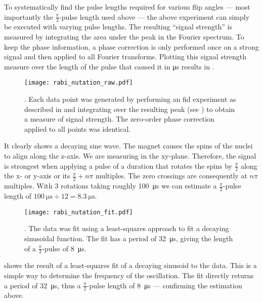To systematically find the pulse lengths required for various flip angles --- most importantly the \(\frac{\pi}{2}\)-pulse length used above --- the above experiment can simply be executed with varying pulse lengths. The resulting \enquote{signal strength} is measured by integrating the area under the peak in the Fourier spectrum. To keep the phase information, a phase correction is only performed once on a strong signal and then applied to all Fourier transforms. Plotting this signal strength measure over the length of the pulse that caused it in \unit{\micro\second} results in .

\begin{figure}[h!bt]
    \centering
    \texttt{[image: rabi\_nutation\_raw.pdf]}
    \caption{. Each data point was generated by performing an \acrshort{fid} experiment as described in  and integrating over the resulting peak (see ) to obtain a measure of signal strength. The zero-order phase correction applied to all points was identical.}
\end{figure}

It clearly shows a decaying sine wave. The magnet causes the spins of the nuclei to align along the z-axis. We are measuring in the xy-plane. Therefore, the signal is strongest when applying a pulse of a duration that rotates the spins by \(\frac{\pi}{2}\) along the x- or y-axis or its \(\frac{\pi}{2} + n\pi{}\) multiples. The zero crossings are consequently at \(n\pi{}\) multiples. With 3 rotations taking roughly \qty{100}{\micro\second} we can estimate a \(\frac{\pi}{2}\)-pulse length of \(\qty{100}{\micro\second}\div 12 = \qty{8.3}{\micro\second}\).

\begin{figure}[h!bt]
    \centering
    \texttt{[image: rabi\_nutation\_fit.pdf]}
    \caption{. The data was fit using a least-squares approach to fit a decaying sinusoidal function. The fit has a period of \qty{32}{\micro\second}, giving the length of a $\frac{\pi}{2}$-pulse of \qty{8}{\micro\second}.}
\end{figure}

 shows the result of a least-squares fit of a decaying sinusoid to the data. This is a simple way to determine the frequency of the oscillation. The fit directly returns a period of \qty{32}{\micro\second}, thus a \(\frac{\pi}{2}\)-pulse length of \qty{8}{\micro\second} --- confirming the estimation above.

